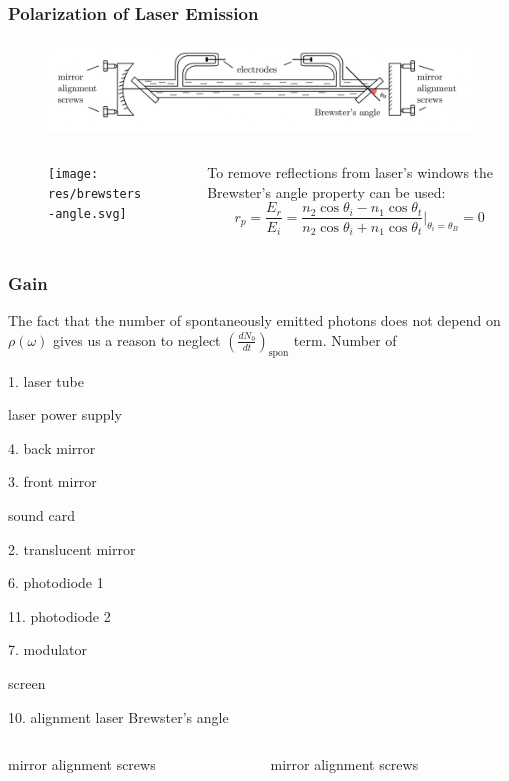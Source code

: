 \documentclass{beamer}
\begin{document}
\begin{frame}
	\frametitle{Polarization of Laser Emission}
	\begin{figure}
		\centering
		\includegraphics[width=1\linewidth]{res/brewster_setup.pdf}
	\end{figure}
	
	\begin{columns}
		\begin{column}{0.3\textwidth}
			\begin{figure}
				\centering
				\texttt{[image: res/brewsters-angle.svg]}
			\end{figure}
		\end{column}
		\begin{column}{0.7\textwidth}
			To remove reflections from laser's windows the Brewster's angle property can be used:
			$$r_p = \frac{E_r}{E_i} = \frac{n_2 \cos{\theta_i} - n_1 \cos{\theta_t}}{n_2 \cos{\theta_i} + n_1 \cos{\theta_t}}\bigg\rvert_{\theta_i = \theta_B} = 0$$
		\end{column}
	\end{columns}	
	

	
\end{frame}


	\begin{frame}
	\frametitle{Gain}
	The fact that the number of spontaneously emitted photons does not depend on  $\rho(\omega)$ gives us a reason to neglect $\left(\frac{dN_0}{dt}\right)_{\text{spon}}$ term. Number of 
	
	1. laser tube
	
	laser power supply
	
	4. back mirror
	
	3. front mirror
	
	sound card
	
	2. translucent mirror
	
	6. photodiode 1
	
	11. photodiode 2
	
	7. modulator
	
	screen
	
	10. alignment laser
	Brewster's angle


\end{frame}
\begin{frame}
	\begin{columns}
		\begin{column}{0.2\textwidth}
			mirror alignment screws
			
			
		\end{column}
		\begin{column}{0.4\textwidth}
		mirror alignment screws
		\end{column}
	\end{columns}
\end{frame}
	
\end{document}
